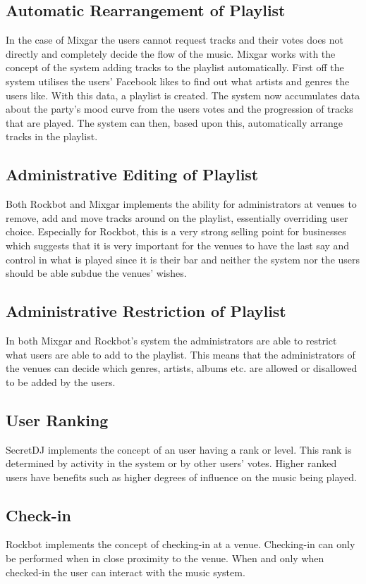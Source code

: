 \subsection{Automatic Rearrangement of Playlist}
\label{sub:auto_rearrange_playlist}
In the case of Mixgar the users cannot request tracks and their votes
does not directly and completely decide the flow of the music. Mixgar
works with the concept of the system adding tracks to the playlist
automatically. First off the system utilises the users’ Facebook likes
to find out what artists and genres the users like. With this data, a
playlist is created. The system now accumulates data about the party’s
mood curve from the users votes and the progression of tracks that are played. The system
can then, based upon this, automatically arrange tracks in the
playlist.

\subsection{Administrative Editing of Playlist}
Both Rockbot and
Mixgar implements the ability for administrators at venues to remove, add
and move tracks around on the playlist, essentially overriding user choice. Especially for Rockbot, this
is a very strong selling point for businesses which suggests that it
is very important for the venues to have the last say and control in
what is played since it is their bar and neither the system nor the users
should be able subdue the venues' wishes.

\subsection{Administrative Restriction of Playlist}
In both Mixgar and Rockbot's system the administrators are able to
restrict what users are able to add to the playlist. This means that
the administrators of the venues can decide which genres, artists,
albums etc. are allowed or disallowed to be added by the users.

\subsection{User Ranking}
SecretDJ implements the concept of an user having a rank or
level. This rank is determined by activity in the system or by other
users' votes. Higher ranked users have benefits such as higher degrees
of influence on the music being played.

\subsection{Check-in}
Rockbot implements the concept of checking-in at a venue. Checking-in
can only be performed when in close proximity to the venue. When and
only when checked-in the user can interact with the music system.

